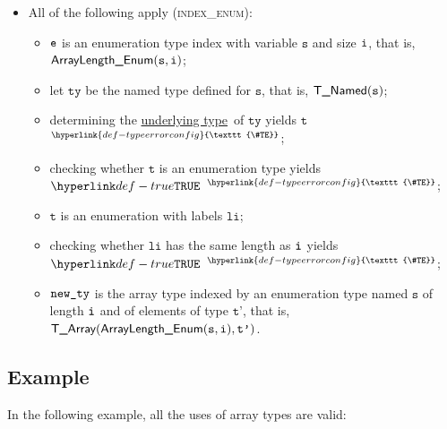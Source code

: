 \documentclass{book}
\newcommand\TypeErrorConfig[0]{\hyperlink{def-typeerrorconfig}{\texttt{\#TE}}}
\newcommand\ProseOrTypeError[0]{\hyperlink{def-proseortypeerror}{$^{\TypeErrorConfig}$}}
\newcommand\underlyingtype[0]{\hyperlink{def-underlyingtype}{underlying type}}
\newcommand\vt[0]{\texttt{t}}
\newcommand\vs[0]{\texttt{s}}
\newcommand\tty[0]{\texttt{ty}}
\newcommand\vtp[0]{\texttt{t'}}
\newcommand\vli[0]{\texttt{li}}
\begin{document}
\begin{itemize}
\begin{itemize}
    \item All of the following apply (\textsc{index\_enum}):
    \begin{itemize}
      \item $\texttt{e}$ is an enumeration type index with variable $\vs$ and size $\texttt{i}$,
      that is, \\ $\ArrayLengthEnum(\vs, \vi)$;
      \item let $\tty$ be the named type defined for $\vs$, that is, $\TNamed(\vs)$;
      \item determining the \underlyingtype\ of $\tty$ yields $\vt$ \ProseOrTypeError;
      \item checking whether $\vt$ is an enumeration type yields $\True$ \ProseOrTypeError;
      \item $\vt$ is an enumeration with labels $\vli$;
      \item checking whether $\vli$ has the same length as $\texttt{i}$ yields $\True$ \ProseOrTypeError;
      \item $\texttt{new\_ty}$ is the array type indexed by an enumeration type
      named $\vs$ of length $\texttt{i}$ and of elements of type $\vtp$, that is, $\TArray(\ArrayLengthEnum(\vs, \vi), \vtp)$.
    \end{itemize}
  \end{itemize}
\end{itemize}

\subsection{Example}
In the following example, all the uses of array types are valid:

\end{document}

